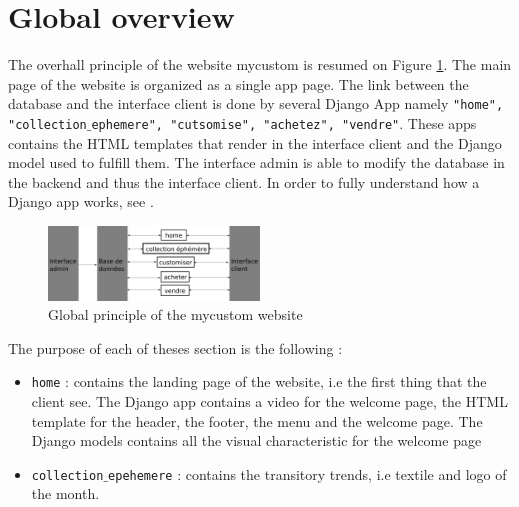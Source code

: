 \section{Global overview}

The overhall principle of the website mycustom is resumed on Figure \ref{fig:principe}. The main page of the website is organized as a single app page. The link between the database and the interface client is done by several Django App namely \texttt{"home", "collection$\_$ephemere", "cutsomise", "achetez", "vendre"}. These apps contains the HTML templates that render in the interface client and the Django model used to fulfill them. The interface admin is able to modify the database in the backend and thus the interface client. In order to fully understand how a Django app works, see \cite{Django}. 

\begin{figure}[!ht]
	\centering
	\includegraphics[width=0.5\textwidth]{Intro/principe}
	\caption{Global principle of the mycustom website}
	\label{fig:principe}
\end{figure}

The purpose of each of theses section is the following : 

\begin{itemize}
	\item \texttt{home} : contains the landing page of the website, i.e the first thing that the client see. The Django app contains a video for the welcome page, the HTML template for the header, the footer, the menu and the welcome page. The Django models contains all the visual characteristic for the welcome page
	\item \texttt{collection$\_$epehemere} : contains the transitory trends, i.e textile and logo of the month. 
\end{itemize}